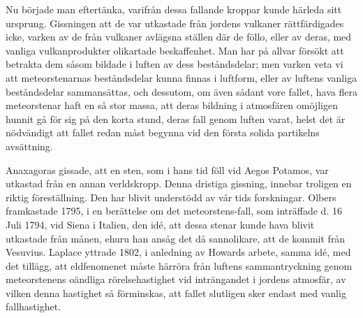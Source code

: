 \documentclass[a4paper, 12pt, oneside, swedish]{article}
\begin{document}
Nu började man eftertänka, varifrån dessa fallande kroppar kunde härleda sitt ursprung. Gissningen att de var utkastade från jordens vulkaner rättfärdigades icke, varken av de från vulkaner avlägsna ställen där de föllo, eller av deras, med vanliga vulkanprodukter olikartade beskaffenhet. Man har på allvar försökt att betrakta dem såsom bildade i luften av dess beståndsdelar; men varken veta vi att meteorstenarnas beståndsdelar kunna finnas i luftform, eller av luftens vanliga beståndsdelar sammansättas, och dessutom, om även sådant vore fallet, hava flera meteorstenar haft en så stor massa, att deras bildning i atmosfären omöjligen hunnit gå för sig på den korta stund, deras fall genom luften varat, helst det är nödvändigt att fallet redan måst begynna vid den första solida partikelns avsättning.

Anaxagoras gissade, att en sten, som i hans tid föll vid Aegos Potamos, var utkastad från en annan verldskropp. Denna dristiga gissning, innebar troligen en riktig föreställning. Den har blivit understödd av vår tids forskningar. Olbers framkastade 1795, i en berättelse om det meteorstens-fall, som inträffade d. 16 Juli 1794, vid Siena i Italien, den idé, att dessa stenar kunde hava blivit utkastade från månen, ehuru han ansåg det då sannolikare, att de kommit från Vesuvius. Laplace yttrade 1802, i anledning av Howards arbete, samma idé, med det tillägg, att eldfenomenet måste härröra från luftens sammantryckning genom meteorstenens oändliga rörelsehastighet vid inträngandet i jordens atmosfär, av vilken denna hastighet så förminskas, att fallet slutligen sker endast med vanlig fallhastighet.
\end{document}
